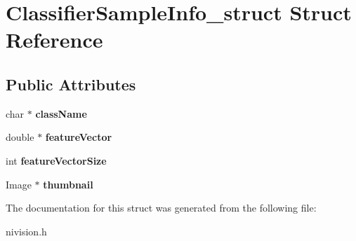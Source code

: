 \hypertarget{structClassifierSampleInfo__struct}{\section{\-Classifier\-Sample\-Info\-\_\-struct \-Struct \-Reference}
\label{structClassifierSampleInfo__struct}
}
\subsection*{\-Public \-Attributes}
\begin{DoxyCompactItemize}
\item 
\hypertarget{structClassifierSampleInfo__struct_aa2a108aa12f570b0c96224f838e800fa}{char $\ast$ {\bfseries class\-Name}}\label{structClassifierSampleInfo__struct_aa2a108aa12f570b0c96224f838e800fa}

\item 
\hypertarget{structClassifierSampleInfo__struct_aa5d5583417632de57ee7e8adf16ecc1e}{double $\ast$ {\bfseries feature\-Vector}}\label{structClassifierSampleInfo__struct_aa5d5583417632de57ee7e8adf16ecc1e}

\item 
\hypertarget{structClassifierSampleInfo__struct_ae9229bafe5e7bd33c32530033a37c231}{int {\bfseries feature\-Vector\-Size}}\label{structClassifierSampleInfo__struct_ae9229bafe5e7bd33c32530033a37c231}

\item 
\hypertarget{structClassifierSampleInfo__struct_adf380f770cb82b5fc67c3a51bc3797d9}{\-Image $\ast$ {\bfseries thumbnail}}\label{structClassifierSampleInfo__struct_adf380f770cb82b5fc67c3a51bc3797d9}

\end{DoxyCompactItemize}


\-The documentation for this struct was generated from the following file\-:\begin{DoxyCompactItemize}
\item 
nivision.\-h\end{DoxyCompactItemize}
